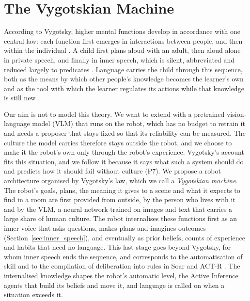%
%     
%     
%     
%     
%     

\section{The Vygotskian Machine}
\label{sec:vygotskian}

According to Vygotsky, higher mental functions develop in accordance with one central law: each function first
emerges in interactions between people, and then within the individual \cite{vygotsky1978mind}. A child first plans
aloud with an adult, then aloud alone in private speech, and finally in inner speech, which is silent, abbreviated and
reduced largely to predicates \cite{vygotsky1986thought}. Language carries the child through this sequence, both as
the means by which other people's knowledge becomes the learner's own and as the tool with which the learner
regulates its actions while that knowledge is still new \cite{luria1961role}.

Our aim is not to model this theory. We want to extend \cortex{} with a pretrained vision-language model (VLM) that
runs on the robot, which has no budget to retrain it and needs a proposer that stays fixed so that its reliability can
be measured. The culture the model carries therefore stays outside the robot, and we choose to make it the robot's own
only through the robot's experience. Vygotsky's account fits this situation, and we follow it because it says what
such a system should do and predicts how it should fail without culture (P7). We propose a robot architecture organised by Vygotsky's law, which we call a \emph{Vygotskian machine}. The robot's goals,
plans, the meaning it gives to a scene and what it expects to find in a room are first provided from outside, by the
person who lives with it and by the VLM, a neural network trained on images and text that
carries a large share of human culture. The robot internalises these functions first as an inner voice that asks
questions, makes plans and imagines outcomes (Section~\ref{sec:inner_speech}), and eventually as prior beliefs,
counts of experience and habits that need no language. This last stage goes beyond Vygotsky, for whom inner speech
ends the sequence, and corresponds to the automatisation of skill \cite{fitts1967human} and to the compilation of
deliberation into rules in Soar and ACT-R \cite{laird1986chunking, taatgen2002production}. The internalised
knowledge shapes the robot's automatic level, the Active Inference agents that build its beliefs and move it, and language is called on when a situation exceeds it.


